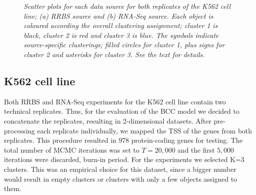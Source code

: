 \begin{figure}[ht!]
     \begin{center}
    \end{center}
    \caption{\emph{Scatter plots for each data source for both replicates of the K562 cell line; (a) RRBS source and (b) RNA-Seq source.  Each object is coloured according the overall clustering assignment; cluster 1 is black, cluster 2 is red and cluster 3 is blue. The symbols indicate source-specific clusterings; filled circles for cluster 1, plus signs for cluster 2 and asterisks for cluster 3. See the text for details.}}
   \label{bccMV-pic}
\end{figure}


\subsection{K562 cell line}
Both RRBS and RNA-Seq experiments for the K562 cell line contain two technical replicates. Thus, for the evaluation of the BCC model we decided to concatenate the replicates, resulting in 2-dimensional datasets. After pre-processing each replicate individually, we mapped the TSS of the genes from both replicates. This procedure resulted in 978 protein-coding genes for testing. The total number of MCMC iterations was set to $T=20,000$ and the first $5,000$ iterations were discarded, \ie burn-in period. For the experiments we selected K=3 clusters. This was an empirical choice for this dataset, since a bigger number would result in empty clusters or clusters with only a few objects assigned to them.

